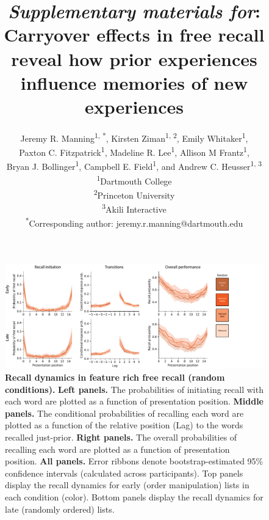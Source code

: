\documentclass{article}
\title{\textit{Supplementary materials for}: Carryover effects in free recall reveal how prior experiences influence memories of new experiences}
\author{Jeremy R. Manning\textsuperscript{1, *}, Kirsten
Ziman\textsuperscript{1, 2}, Emily Whitaker\textsuperscript{1},\\Paxton C.
Fitzpatrick\textsuperscript{1}, Madeline R. Lee\textsuperscript{1}, Allison M
Frantz\textsuperscript{1},\\Bryan J. Bollinger\textsuperscript{1}, Campbell E.
Field\textsuperscript{1}, and Andrew C. Heusser\textsuperscript{1,
3}\\\textsuperscript{1}Dartmouth College\\\textsuperscript{2}Princeton
University\\\textsuperscript{3}Akili
Interactive\\\textsuperscript{*}Corresponding author:
jeremy.r.manning@dartmouth.edu}
\date{}
\begin{document}
\renewcommand{\figurename}{Supplementary Figure}


\setcounter{equation}{0}
\setcounter{figure}{0}
\setcounter{table}{0}
\setcounter{page}{1}
\setcounter{section}{0}
\makeatletter
\renewcommand{\theequation}{S\arabic{equation}}
\renewcommand{\thefigure}{S\arabic{figure}}
\renewcommand{\bibnumfmt}[1]{[S#1]}
\renewcommand{\citenumfont}[1]{S#1}

\maketitle

\begin{figure}[p] \centering
\includegraphics[width=\textwidth]{figures/recall_dynamics_random}

\caption{\textbf{Recall dynamics in feature rich free recall (random conditions).} \textbf{Left panels.} The probabilities of
initiating recall with each word are plotted as a function of presentation
position. \textbf{Middle panels.} The conditional probabilities of recalling
each word are plotted as a function of the relative position (Lag) to the words
recalled just-prior. \textbf{Right panels.} The overall probabilities of
recalling each word are plotted as a function of presentation position.
\textbf{All panels.} Error ribbons denote bootstrap-estimated 95\% confidence
intervals (calculated across participants). Top panels display the recall
dynamics for early (order manipulation) lists in each condition (color). Bottom
panels display the recall dynamics for late (randomly ordered) lists.}

    \label{fig:recall-dynamics-random}
\end{figure}
\end{document}
